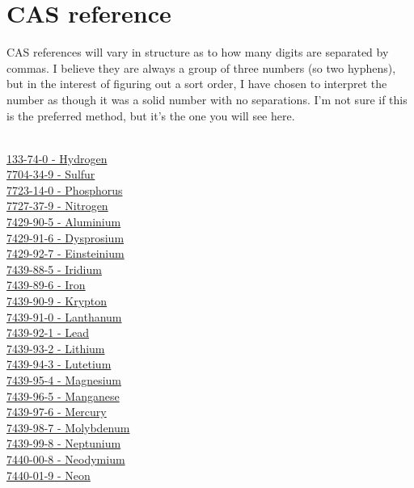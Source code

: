 \documentclass{book}
\begin{document}
\chapter{CAS reference}
CAS references will vary in structure as to how many digits are separated by commas.  I believe they are always a group of three numbers (so two hyphens), but in the interest of figuring out a sort order, I have chosen to interpret the number as though it was a solid number with no separations.  I'm not sure if this is the preferred method, but it's the one you will see here.\\
\\
\begin{multicols}{2}
\noindent
\hyperref[sec:elem-hydrogen]{133-74-0 - Hydrogen}\\
\hyperref[sec:elem-sulfur]{7704-34-9 - Sulfur}\\
\hyperref[sec:elem-phosphorus]{7723-14-0 - Phosphorus}\\
\hyperref[sec:elem-nitrogen]{7727-37-9 - Nitrogen}\\
\hyperref[sec:elem-aluminium]{7429-90-5 - Aluminium}\\
\hyperref[sec:elem-dysprosium]{7429-91-6 - Dysprosium}\\
\hyperref[sec:elem-einsteinium]{7429-92-7 - Einsteinium}\\
\hyperref[sec:elem-iridium]{7439-88-5 - Iridium}\\
\hyperref[sec:elem-iron]{7439-89-6 - Iron}\\
\hyperref[sec:elem-krypton]{7439-90-9 - Krypton}\\
\hyperref[sec:elem-lanthanum]{7439-91-0 - Lanthanum}\\
\hyperref[sec:elem-lead]{7439-92-1 - Lead}\\
\hyperref[sec:elem-lithium]{7439-93-2 - Lithium}\\
\hyperref[sec:elem-lutetium]{7439-94-3 - Lutetium}\\
\hyperref[sec:elem-magnesium]{7439-95-4 - Magnesium}\\
\hyperref[sec:elem-manganese]{7439-96-5 - Manganese}\\
\hyperref[sec:elem-mercury]{7439-97-6 - Mercury}\\
\hyperref[sec:elem-molybdenum]{7439-98-7 - Molybdenum}\\
\hyperref[sec:elem-neptunium]{7439-99-8 - Neptunium}\\
\hyperref[sec:elem-neodymium]{7440-00-8 - Neodymium}\\
\hyperref[sec:elem-neon]{7440-01-9 - Neon}\\

\end{multicols}
\end{document}
